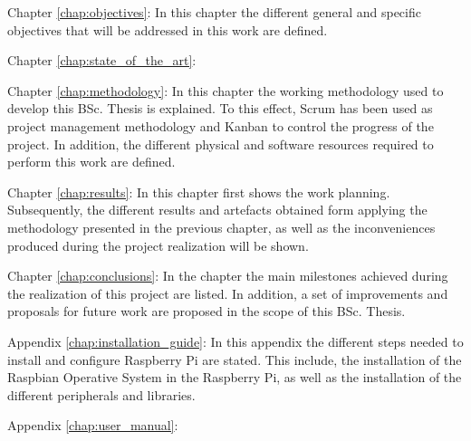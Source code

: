 \begin{definitionlist}
	\item[Chapter \ref{chap:objectives}: \nameref{chap:objectives}] In this chapter the different general and specific objectives that will be addressed in this work are defined.
	
	\item[Chapter \ref{chap:state_of_the_art}: \nameref{chap:state_of_the_art}] 
	
	\item[Chapter \ref{chap:methodology}: \nameref{chap:methodology}] In this chapter the working methodology used to develop this \ac{BSc.} Thesis is explained. To this effect, Scrum has been used as project management methodology and Kanban to control the progress of the project. In addition, the different physical and software resources required to perform this work are defined.
	
	\item[Chapter \ref{chap:results}: \nameref{chap:results}] In this chapter first shows the work planning. Subsequently, the different results and artefacts obtained form applying the methodology presented in the previous chapter, as well as the inconveniences produced during the project realization will be shown. 
	
	\item[Chapter \ref{chap:conclusions}: \nameref{chap:conclusions}] In the chapter the main milestones achieved during the realization of this project are listed. In addition, a set of improvements and proposals for future work are proposed in the scope of this \ac{BSc.} Thesis. 
	
	\item[Appendix \ref{chap:installation_guide}: \nameref{chap:installation_guide}] In this appendix the different steps needed to install and configure Raspberry Pi are stated. This include, the installation of the Raspbian Operative System in the Raspberry Pi, as well as the installation of the different peripherals and libraries.
	
	\item[Appendix \ref{chap:user_manual}: \nameref{chap:user_manual}] 
\end{definitionlist}


